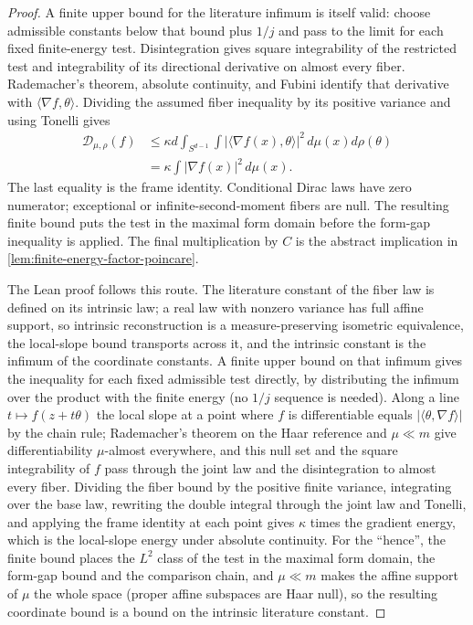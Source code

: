 \begin{proof}
  \leanok
  A finite upper bound for the literature infimum is itself valid: choose admissible constants
  below that bound plus $1/j$ and pass to the limit for each fixed finite-energy test.
  Disintegration gives square integrability of the restricted test and integrability of its
  directional derivative on almost every fiber. Rademacher's theorem, absolute continuity,
  and Fubini identify that derivative with $\langle\nabla f,\theta\rangle$. Dividing the
  assumed fiber inequality by its positive variance and using Tonelli gives
  \begin{align*}
    \mathcal D_{\mu,\rho}(f)
      &\le \kappa d\int_{S^{d-1}}\int
                |\langle\nabla f(x),\theta\rangle|^2\,d\mu(x)d\rho(\theta)\\
      &=\kappa\int|\nabla f(x)|^2\,d\mu(x).
  \end{align*}
  The last equality is the frame identity. Conditional Dirac laws have zero numerator;
  exceptional or infinite-second-moment fibers are null. The resulting finite bound puts the
  test in the maximal form domain before the form-gap inequality is applied. The final
  multiplication by $C$ is the abstract implication in \cref{lem:finite-energy-factor-poincare}.

  The Lean proof follows this route.  The literature constant of the fiber law is defined on its
  intrinsic law; a real law with nonzero variance has full affine support, so intrinsic
  reconstruction is a measure-preserving isometric equivalence, the local-slope bound transports
  across it, and the intrinsic constant is the infimum of the coordinate constants.  A finite
  upper bound on that infimum gives the inequality for each fixed admissible test directly, by
  distributing the infimum over the product with the finite energy (no $1/j$ sequence is needed).
  Along a line $t\mapsto f(z+t\theta)$ the local slope at a point where $f$ is differentiable
  equals $|\langle\theta,\nabla f\rangle|$ by the chain rule; Rademacher's theorem on the Haar
  reference and $\mu\ll m$ give differentiability $\mu$-almost everywhere, and this null set and
  the square integrability of $f$ pass through the joint law and the disintegration to almost
  every fiber.  Dividing the fiber bound by the positive finite variance, integrating over the
  base law, rewriting the double integral through the joint law and Tonelli, and applying the
  frame identity at each point gives $\kappa$ times the gradient energy, which is the local-slope
  energy under absolute continuity.  For the ``hence'', the finite bound places the $L^2$ class of
  the test in the maximal form domain, the form-gap bound and the comparison chain, and $\mu\ll m$
  makes the affine support of $\mu$ the whole space (proper affine subspaces are Haar null), so the
  resulting coordinate bound is a bound on the intrinsic literature constant.
\end{proof}

